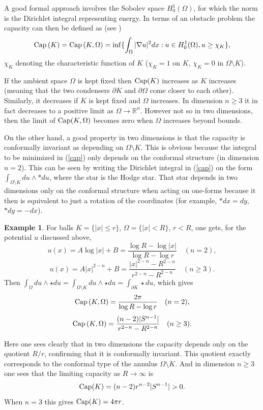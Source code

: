 \documentclass[reqno,12pt]{article}
\theoremstyle{plain}
\theoremstyle{definition}
\newtheorem{example}[defn]{Example}
\numberwithin{equation}{section}
\numberwithin{figure}{section}
\def\R{{\mathbb R}}
\begin{document}
A good formal approach involves the Sobolev space $H_0^1(\Omega)$, for which the norm is the 
Dirichlet integral representing energy. In terms of an obstacle problem 
the capacity can then be defined as (see \cite{Treves-1975, Kinderlehrer-Stampacchia-1980})
\begin{equation}\label{cap}
{\rm Cap}\,(K)={\rm Cap}\,(K,\Omega)=\inf \{\int_\Omega |\nabla u|^2 dx: u\in H_0^1(\Omega), u\geq \chi_K\},
\end{equation}
$\chi_K$ denoting the characteristic  function of $K$ ($\chi_K=1$ on $K$, $\chi_K=0$ in $\Omega\setminus K$).

If the ambient space $\Omega$ is kept fixed then ${\rm Cap}(K)$ increases as $K$ increases
(meaning that the two condensers $\partial K$ and $\partial\Omega$ come closer to each other). 
Similarly, it decreases if $K$ is kept fixed and $\Omega$ increases. In dimension $n\geq 3$ 
it in fact decreases to a positive limit as $\Omega\to \R^n$. However not so in two dimensions,
then the limit of ${\rm Cap}(K,\Omega)$ becomes zero when $\Omega$ increases beyond bounds.

On the other hand, a good property in two dimensions is that the capacity is conformally invariant 
as depending on $\Omega\setminus K$.  
This is obvious because the integral to be minimized in (\ref{cap}) only depends on the conformal structure
(in dimension $n=2$). This can be seen by writing the Dirichlet integral in (\ref{cap}) on the form
$\int_{\Omega\setminus K} du\wedge *du$, where the star is the Hodge star. That star depends in two dimensions
only on the conformal structure when acting on one-forms because it then is equivalent to just a rotation of
the coordinates (for example, $*dx=dy$, $*dy=-dx$).

\begin{example}
For balls $K=\{|x|\leq r\}$, $\Omega=\{|x|<R\}$, $r<R$, one gets, for the potential $u$ discussed above,
$$
u(x)=A\log |x|+B= \frac{\log R-\log |x|}{\log R-\log r}\quad (n=2), 
$$
$$
u(x)=A|x|^{2-n}+B=\frac{|x|^{2-n}-R^{2-n}}{r^{2-n}-R^{2-n}} \quad (n\geq 3).
$$
Then $\int_\Omega  du\wedge\star du =\int_{\Omega\setminus K}  du\wedge\star du=\int_{\partial K}\star du$, which gives
\begin{equation}\label{cap2}
{\rm Cap}\,(K,\Omega)
=\frac{2\pi}{\log R-\log r}\quad (n=2),
\end{equation}
$$
{\rm Cap}\,(K,\Omega)=\frac{(n-2)|S^{n-1}|}{r^{2-n}-R^{2-n}}\quad (n\geq 3).
$$

Here one sees clearly that in two dimensions the capacity depends only on the quotient $R/r$, confirming that it is conformally invariant. 
This quotient exactly corresponds to the conformal type of the annulus $\Omega\setminus K$.  And in dimension $n\geq 3$ one sees
that the limiting capacity as $R\to\infty$ is
$$
{\rm Cap}(K)=(n-2)r^{n-2}|S^{n-1}|>0.
$$
When $n=3$ this gives ${\rm Cap}(K)=4\pi r$.
\end{example}
\end{document}
